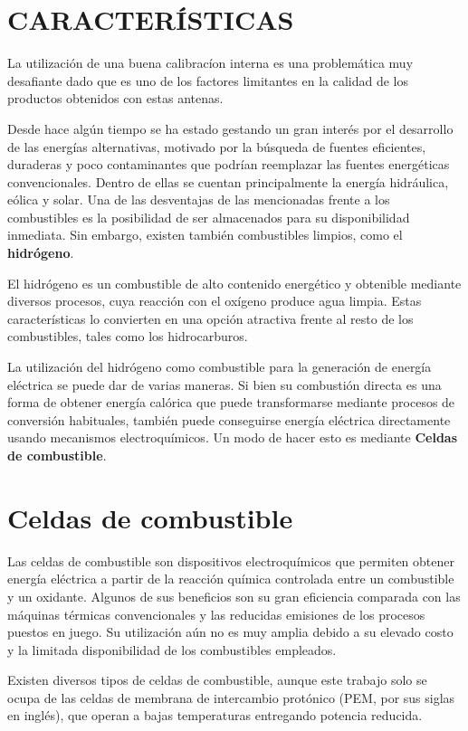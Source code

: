 \section{CARACTERÍSTICAS}
    
La utilización de una buena calibracíon interna es una problemática muy desafiante dado que es uno de los factores limitantes en la calidad de
los productos obtenidos con estas antenas.



Desde hace algún tiempo se ha estado gestando un gran interés por el desarrollo de las energías alternativas, motivado por la búsqueda
de fuentes eficientes, duraderas y poco contaminantes que podrían reemplazar las fuentes energéticas convencionales.
Dentro de ellas se cuentan principalmente la energía hidráulica, eólica y solar. Una de las desventajas de las mencionadas frente a los
combustibles es la posibilidad de ser almacenados para su disponibilidad inmediata. Sin embargo, existen también combustibles limpios,
como el \textbf{hidrógeno}.

El hidrógeno es un combustible de alto contenido energético y obtenible mediante diversos procesos, cuya reacción con el oxígeno produce agua
limpia. Estas características lo convierten en una opción atractiva frente al resto de los combustibles, tales como los hidrocarburos.

La utilización del hidrógeno como combustible para la generación de energía eléctrica se puede dar de varias maneras. Si bien su combustión
directa es una forma de obtener energía calórica que puede transformarse mediante procesos de conversión habituales, también puede conseguirse
energía eléctrica directamente usando mecanismos electroquímicos. Un modo de hacer esto es mediante \textbf{Celdas de combustible}.

\section{Celdas de combustible}
Las celdas de combustible son dispositivos electroquímicos que permiten obtener energía eléctrica a partir de la reacción química controlada
entre un combustible y un oxidante. Algunos de sus beneficios son su gran eficiencia comparada con las máquinas térmicas convencionales y
las reducidas emisiones de los procesos puestos en juego. Su utilización aún no es muy amplia debido a su elevado costo y la limitada
disponibilidad de los combustibles empleados.

Existen diversos tipos de celdas de combustible, aunque este trabajo solo se ocupa de las celdas de membrana de intercambio protónico
(PEM, por sus siglas en inglés), que operan a bajas temperaturas entregando potencia reducida. 

